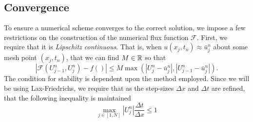 \documentclass{myproject}
\begin{document}
\subsection{Convergence}
To ensure a numerical scheme converges to the correct solution, we impose a few restrictions on the construction of the numerical flux function $\mathcal{F}$. First, we require that it is \emph{Lipschitz continuous}. That is, when $u(x_j,t_n) \approx \bar{u}_j^n$ about some mesh point $(x_j,t_n)$, that we can find $M \in \operatorname{\mathbb{R}}$ so that
\begin{equation}
    \left| \mathcal{F}(U_{j-1}^n, U_j^n) - f() \right| \leq M \max\left( \left| U_j^n - \bar{u}_j^n \right|, \left| U_{j-1}^n - \bar{u}_j^n \right| \right).
\end{equation}
The condition for stability is dependent upon the method employed. Since we will be using Lax-Friedrichs, we require that as the step-sizes $\Delta x$ and $\Delta t$ are refined, that the following inequality is maintained
\begin{equation}
    \max_{j \in [1, N]} |U_j^n| \frac{\Delta t}{\Delta x} \leq 1
\end{equation}
\end{document}
